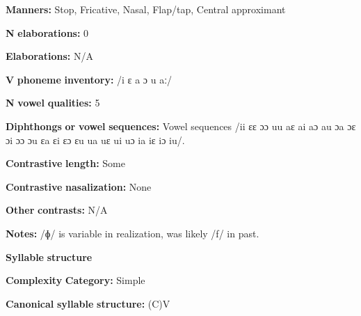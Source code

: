 \documentclass[output=paper]{langsci/langscibook}
\begin{document}
\begin{styleBody}
\textbf{Manners:} Stop, Fricative, Nasal, Flap/tap, Central approximant
\end{styleBody}

\begin{styleBody}
\textbf{N} \textbf{elaborations:} 0
\end{styleBody}

\begin{styleBody}
\textbf{Elaborations:} N/A
\end{styleBody}

\begin{styleBody}
\textbf{V} \textbf{phoneme} \textbf{inventory:} /i ɛ a ɔ u aː/
\end{styleBody}

\begin{styleBody}
\textbf{N} \textbf{vowel} \textbf{qualities:} 5
\end{styleBody}

\begin{styleBody}
\textbf{Diphthongs} \textbf{or} \textbf{vowel} \textbf{sequences:} Vowel sequences /ii ɛɛ ɔɔ uu aɛ ai aɔ au ɔa ɔɛ ɔi ɔɔ ɔu ɛa ɛi ɛɔ ɛu ua uɛ ui uɔ ia iɛ iɔ iu/.
\end{styleBody}

\begin{styleBody}
\textbf{Contrastive} \textbf{length:} Some
\end{styleBody}

\begin{styleBody}
\textbf{Contrastive} \textbf{nasalization:} None
\end{styleBody}

\begin{styleBody}
\textbf{Other} \textbf{contrasts:} N/A
\end{styleBody}

\begin{styleBody}
\textbf{Notes:} /ɸ/ is variable in realization, was likely /f/ in past.
\end{styleBody}

\begin{styleBody}
\textbf{Syllable} \textbf{structure}
\end{styleBody}

\begin{styleBody}
\textbf{Complexity} \textbf{Category:} Simple
\end{styleBody}

\begin{styleBody}
\textbf{Canonical} \textbf{syllable} \textbf{structure:} (C)V \citep[533-8]{Bauer1999}
\end{styleBody}
\end{document}
